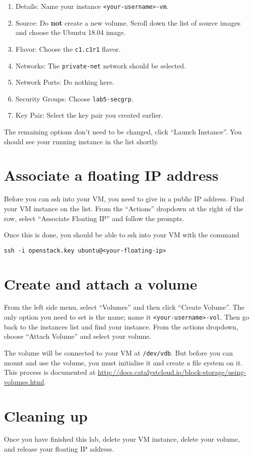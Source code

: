 \documentclass{article}
\begin{document}
\begin{enumerate}
  \item Details: Name your instance \texttt{<your-username>-vm}.
  \item Source: Do \textbf{not} create a new volume. Scroll down the list of source images and choose the Ubuntu 18.04 image.
  \item Flavor: Choose the \texttt{c1.c1r1} flavor.
  \item Networks: The \texttt{private-net} network should be selected.
  \item Network Ports: Do nothing here.
  \item Security Groups: Choose \texttt{lab5-secgrp}.
  \item Key Pair: Select the key pair you created earlier.
 \end{enumerate}
 
 The remaining options don't need to be changed, click ``Launch Instance''. You should see your running instance in the list shortly.
 
 \section{Associate a floating IP address}
 Before you can ssh into your VM, you need to give in a public IP address. Find your VM instance on the list. From the ``Actions'' dropdown at the right of the row, select ``Associate Floating IP'' and follow the prompts.
 
 Once this is done, you should be able to ssh into your VM with the command
 
 \texttt{ssh -i openstack.key ubuntu@<your-floating-ip>}

\section{Create and attach a volume}
From the left side menu, select ``Volumes'' and then click ``Create Volume''. The only option you need to set is the name; name it \texttt{<your-username>-vol}. Then go back to the instances list and find your instance. From the actions dropdown, choose ``Attach Volume'' and select your volume.

The volume will be connected to your VM at \texttt{/dev/vdb}. But before you can mount and use the volume, you must initialise it and create a file system on it. This process is documented at \url{http://docs.catalystcloud.io/block-storage/using-volumes.html}.

\section{Cleaning up}
Once you have finished this lab, delete your VM instance, delete your volume, and release your floating IP address.
\end{document}
